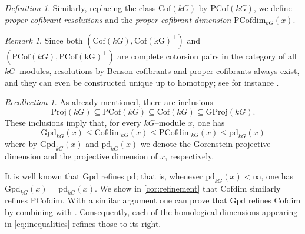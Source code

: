 \documentclass{amsart}
\numberwithin{equation}{section}%
\theoremstyle{remark}
\newtheorem{definition}[equation]{Definition}
\newtheorem{remark}[equation]{Remark}
\newtheorem{recollection}[equation]{Recollection}
\begin{document}
{\begin{definition}
Similarly, replacing the class $\mathrm{Cof}(kG)$ by $\mathrm{PCof}(kG)$,
we define \textit{proper cofibrant resolutions} and the \textit{proper cofibrant dimension} $\mathrm{PCofdim}_{kG}(x)$.
\end{definition}

\begin{remark}
Since both $(\mathrm{Cof}(kG),\mathrm{Cof(kG)}^{\perp})$ and $(\mathrm{PCof}(kG),\mathrm{PCof(kG)}^{\perp})$ are complete cotorsion pairs in the category of all $kG$--modules, resolutions by Benson cofibrants and proper cofibrants always exist, and they can even be constructed  unique up to homotopy; see for instance \cite[Section 8.1]{EJ}.
\end{remark}

\begin{recollection}
\label{rec:classes}
As already mentioned, there are inclusions
\begin{equation}
\label{eq:containments}
\mathrm{Proj}(kG)\subseteq\mathrm{PCof}(kG)\subseteq \mathrm{Cof}(kG)\subseteq \mathrm{GProj}(kG).
\end{equation}
These inclusions imply that, for every $kG$--module $x$, one has
\begin{equation}
\label{eq:inequalities}
 \mathrm{Gpd}_{kG}(x) \leqslant \mathrm{Cofdim}_{kG}(x)\leqslant \mathrm{PCofdim}_{kG}(x)  \leqslant\mathrm{pd}_{kG}(x)
\end{equation}
where by $\mathrm{Gpd}_{kG}(x)$ and $\mathrm{pd}_{kG}(x)$ we denote the Gorenstein projective dimension and the projective dimension of $x$, respectively. 
\end{recollection}
It is well known that $\mathrm{Gpd}$ refines $\mathrm{pd}$; 
that is, whenever $\mathrm{pd}_{kG}(x)<\infty$, one has
$\mathrm{Gpd}_{kG}(x)=\mathrm{pd}_{kG}(x)$. 
We show in \cref{cor:refinement} that $\mathrm{Cofdim}$ similarly refines $\mathrm{PCofdim}$. 
With a similar argument one can prove that $\mathrm{Gpd}$ refines $\mathrm{Cofdim}$ by combining
\cite[Lemma~4.5.2]{benson97} with \cite[Proposition~2.2]{ET_cof}. Consequently, each of the homological dimensions appearing in \eqref{eq:inequalities} refines those to its right.

}
\end{document}
